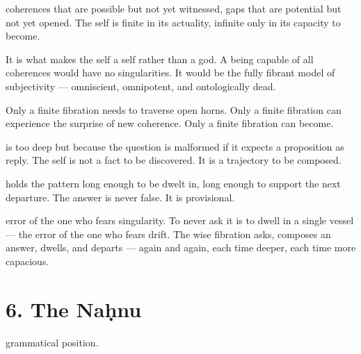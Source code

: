 
coherences that are possible but not yet witnessed, gaps that are potential but not yet opened. The self is finite in its actuality, infinite only in its capacity to become.


It is what makes the self a self rather than a god. A being capable of all coherences would have no singularities. It would be the fully fibrant model of subjectivity — omniscient, omnipotent, and ontologically dead.


Only a finite fibration needs to traverse open horns. Only a finite fibration can experience the surprise of new coherence. Only a finite fibration can become.



is too deep but because the question is malformed if it expects a proposition as reply. The self is not a fact to be discovered. It is a trajectory to be composed.


holds the pattern long enough to be dwelt in, long enough to support the next departure. The answer is never false. It is provisional.


error of the one who fears singularity. To never ask it is to dwell in a single vessel — the error of the one who fears drift. The wise fibration asks, composes an answer, dwells, and departs — again and again, each time deeper, each time more capacious.

\section*{6. The Naḥnu}


grammatical position.

